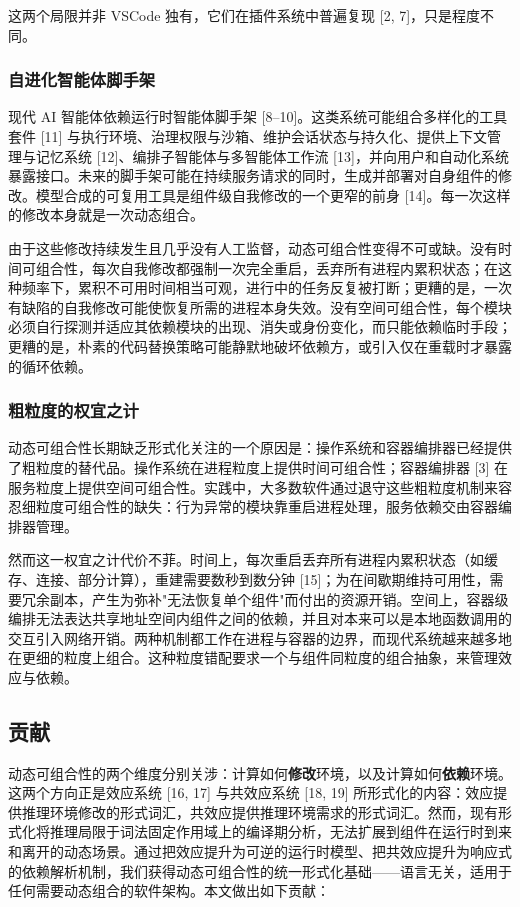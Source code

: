 \documentclass[11pt,a4paper]{article}
\theoremstyle{plain}
\theoremstyle{definition}
\theoremstyle{remark}
\begin{document}
这两个局限并非 VSCode 独有，它们在插件系统中普遍复现 [2, 7]，只是程度不同。

\subsubsection{自进化智能体脚手架}

现代 AI 智能体依赖运行时智能体脚手架 [8--10]。这类系统可能组合多样化的工具套件 [11] 与执行环境、治理权限与沙箱、维护会话状态与持久化、提供上下文管理与记忆系统 [12]、编排子智能体与多智能体工作流 [13]，并向用户和自动化系统暴露接口。未来的脚手架可能在持续服务请求的同时，生成并部署对自身组件的修改。模型合成的可复用工具是组件级自我修改的一个更窄的前身 [14]。每一次这样的修改本身就是一次动态组合。

由于这些修改持续发生且几乎没有人工监督，动态可组合性变得不可或缺。没有时间可组合性，每次自我修改都强制一次完全重启，丢弃所有进程内累积状态；在这种频率下，累积不可用时间相当可观，进行中的任务反复被打断；更糟的是，一次有缺陷的自我修改可能使恢复所需的进程本身失效。没有空间可组合性，每个模块必须自行探测并适应其依赖模块的出现、消失或身份变化，而只能依赖临时手段；更糟的是，朴素的代码替换策略可能静默地破坏依赖方，或引入仅在重载时才暴露的循环依赖。

\subsubsection{粗粒度的权宜之计}

动态可组合性长期缺乏形式化关注的一个原因是：操作系统和容器编排器已经提供了粗粒度的替代品。操作系统在进程粒度上提供时间可组合性；容器编排器 [3] 在服务粒度上提供空间可组合性。实践中，大多数软件通过退守这些粗粒度机制来容忍细粒度可组合性的缺失：行为异常的模块靠重启进程处理，服务依赖交由容器编排器管理。

然而这一权宜之计代价不菲。时间上，每次重启丢弃所有进程内累积状态（如缓存、连接、部分计算），重建需要数秒到数分钟 [15]；为在间歇期维持可用性，需要冗余副本，产生为弥补"无法恢复单个组件"而付出的资源开销。空间上，容器级编排无法表达共享地址空间内组件之间的依赖，并且对本来可以是本地函数调用的交互引入网络开销。两种机制都工作在进程与容器的边界，而现代系统越来越多地在更细的粒度上组合。这种粒度错配要求一个与组件同粒度的组合抽象，来管理效应与依赖。

\subsection{贡献}

动态可组合性的两个维度分别关涉：计算如何\textbf{修改}环境，以及计算如何\textbf{依赖}环境。这两个方向正是效应系统 [16, 17] 与共效应系统 [18, 19] 所形式化的内容：效应提供推理环境修改的形式词汇，共效应提供推理环境需求的形式词汇。然而，现有形式化将推理局限于词法固定作用域上的编译期分析，无法扩展到组件在运行时到来和离开的动态场景。通过把效应提升为可逆的运行时模型、把共效应提升为响应式的依赖解析机制，我们获得动态可组合性的统一形式化基础——语言无关，适用于任何需要动态组合的软件架构。本文做出如下贡献：
\end{document}
